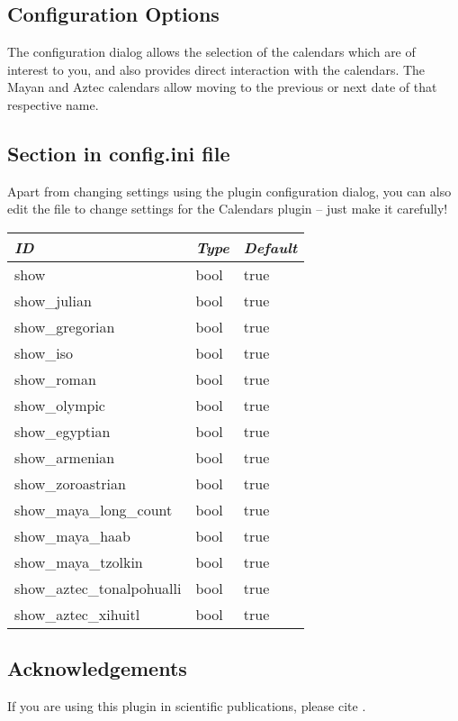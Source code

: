 \subsection{Configuration Options}
\label{sec:plugin:Calendars:configuration}

The configuration dialog allows the selection of the calendars which are
of interest to you, and also provides direct interaction with the calendars.
The Mayan and Aztec calendars allow moving to the previous or next date of that respective name. 

\subsection*{Section  in config.ini file}

Apart from changing settings using the plugin configuration dialog,
you can also edit the  file to change
settings for the Calendars plugin -- just make it carefully!

\begin{longtable}{l|l|l}\toprule
\emph{ID}                      &\emph{Type} & \emph{Default}  \\\midrule
show                         &bool & true\\\midrule
show\_julian                 &bool & true\\
show\_gregorian              &bool & true\\
show\_iso                    &bool & true\\\midrule
show\_roman                  &bool & true\\
show\_olympic                &bool & true\\
show\_egyptian               &bool & true\\
show\_armenian               &bool & true\\
show\_zoroastrian            &bool & true\\\midrule
show\_maya\_long\_count      &bool & true\\
show\_maya\_haab             &bool & true\\
show\_maya\_tzolkin          &bool & true\\
show\_aztec\_tonalpohualli   &bool & true\\
show\_aztec\_xihuitl         &bool & true\\\bottomrule
\end{longtable}

\subsection{Acknowledgements}

If you are using this plugin in scientific publications, please cite \citet{Zotti-etal:JSA2020.6.2}.



